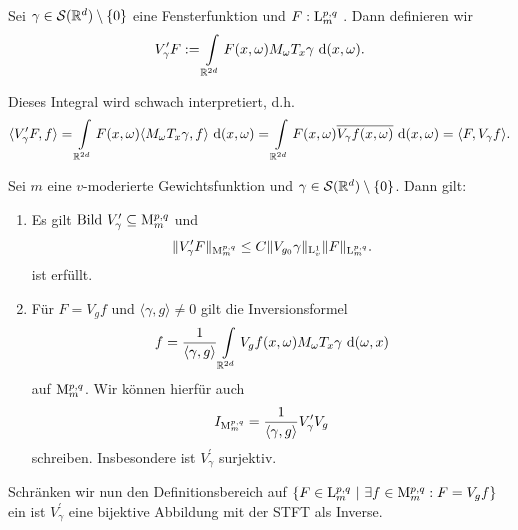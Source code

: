 \begin{df}
	Sei $ \gamma \in \mathcal{S}(\mathbb{R}^d) \setminus \{ 0\} $ eine Fensterfunktion und $ F : \mathrm{L}^{p,q}_m$ .
	Dann definieren wir
	\begin{align*}
	V_\gamma^\prime F 
	:=
	\int \limits_{\mathbb{R}^{2d}}F(x,\omega)  M_\omega T_x \gamma \text{ d} (x,\omega).
	\end{align*}
\end{df}
Dieses Integral wird schwach interpretiert, d.h.
\begin{align*}
\langle V^\prime_\gamma F ,f \rangle
=
\int \limits_{\mathbb{R}^{2d}} F(x,\omega) \langle M_\omega T_x \gamma, f \rangle \text{ d} (x,\omega)
=
\int \limits_{\mathbb{R}^{2d}} F(x,\omega) \overline{V_\gamma f(x,\omega)} \text{ d} (x,\omega)
=
\langle F , V_\gamma f \rangle.
\end{align*}


\begin{sz}\label{th:inversions_formula_modulation}
	Sei $ m $ eine $ v $-moderierte Gewichtsfunktion und $ \gamma \in \mathcal{S}(\mathbb{R}^d) \setminus \{0\} $.
	Dann gilt:
	\begin{enumerate}[label =\textbf{(\roman*)}]
		\item 
		Es gilt $ \mathrm{Bild} \ V_\gamma^\prime \subseteq \mathrm{M}_m^{p,q} $ und 
		\begin{align}\label{eq:inverse_estimate_modulation}
		\| V^\prime_\gamma F \|_{\mathrm{M}^{p,q}_m}
		\leq
		C \| V_{g_0} \gamma \|_{\mathrm{L}^1_v} \| F \|_{\mathrm{L}^{p,q}_m}. 
		\end{align}
		ist erfüllt.
		\item
		Für $ F = V_g f $ und $ \langle \gamma, g \rangle \neq 0 $ gilt die Inversionsformel
		\begin{align}\label{eq:inversion_formula_modulation}
		f = \frac{1}{\langle \gamma, g \rangle}
		\int \limits_{\mathbb{R}^{2d}}V_g f(x,\omega) M_\omega T_x \gamma \text{ d} (\omega,x)
		\end{align}
		auf $ \mathrm{M}^{p,q}_m $. Wir können hierfür auch
		\begin{align}
		I_{\mathrm{M}^{p,q}_m} 
		= \frac{1}{\langle \gamma, g \rangle } V^\prime_\gamma V_g
		\end{align}
		schreiben.
		Insbesondere ist $ V^\prime_\gamma $ surjektiv.
	\end{enumerate}
\end{sz}

Schränken wir nun den Definitionsbereich auf $ \{ F \in \mathrm{L}^{p,q}_m \ | \ \exists f \in  \mathrm{M}_m^{p,q} : F = V_g f\}  $ ein ist 
$ V_\gamma^\prime  $ eine bijektive Abbildung mit der STFT als Inverse.

